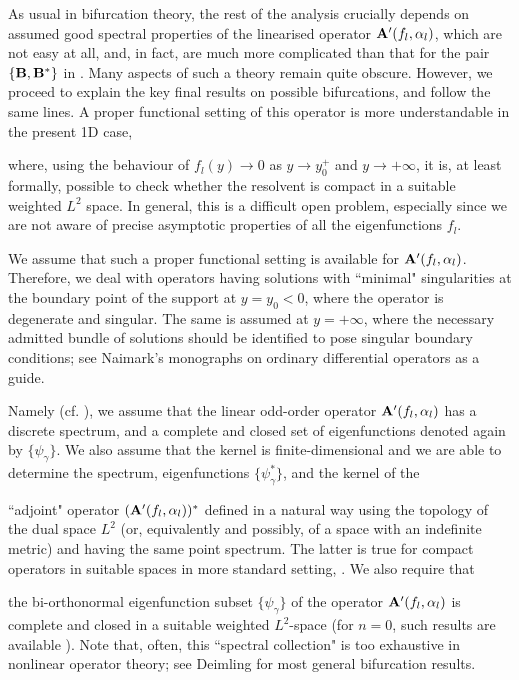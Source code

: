 \documentclass[12pt]{amsart}
\begin{document}
   As usual in bifurcation theory,
 the rest of the analysis crucially  depends on assumed good  spectral properties of
 the linearised operator ${\bf A}'(f_l,{\alpha}_l)$, which are not easy at all, and,
 in fact, are much more
 complicated than that for the pair $\{{{\bf B}},{{\bf B}}^*\}$ in \cite{RayGI}.
 Many aspects of such a theory remain quite obscure. However, we
 proceed to explain the key final results on possible bifurcations,
  and follow the same lines.
  A proper functional setting of this
 operator is more understandable in the present 1D case,
 
 
 
  where, using the behaviour of
 $f_l(y) \to 0$ as $ y \to y_0^+$ and $y \to +{\infty}$, it is, at least formally,
  possible to check whether the
 resolvent is compact in a suitable weighted $L^2$ space. In
 general, this is a difficult open problem, especially since we are not aware of precise asymptotic properties of all the
 eigenfunctions $f_l$.

We assume that such a proper functional setting is available
 for ${\bf A}'(f_l,{\alpha}_l)$. Therefore,
we deal with operators having solutions with ``minimal"
singularities at the boundary point of the support at $y=y_0<0$,
where the operator is degenerate and singular. The same is assumed
 at $y=+{\infty}$, where the necessary admitted bundle of solutions
should be identified to pose singular boundary conditions; see
Naimark's monographs on ordinary differential operators
\cite{NaimarkI, NaimarkII} as a guide.

  Namely (cf. \cite[\S~4]{RayGI}), we assume that the linear odd-order operator
   ${\bf A}'(f_l,{\alpha}_l)$ has a discrete spectrum, and a complete and closed set of
eigenfunctions
   denoted again by $\{\psi_{\gamma}\}$. We also assume that the kernel is finite-dimensional
   and we are able to
  determine the spectrum, eigenfunctions $\{\psi_{\gamma}^*\}$, and  the kernel of the
  
 ``adjoint" operator $({\bf A}'(f_l,{\alpha}_l))^*$ defined in  a natural
  way using the topology of the dual space $L^2$ (or, equivalently and possibly, of a space
   with an indefinite metric)
     and having
  the same point spectrum.
    The latter  is true for compact operators in
 suitable spaces in more standard setting,
  \cite[Ch.~4]{FuncAnaly}.
  We also require that
 
 
 the bi-orthonormal eigenfunction
  subset $\{\psi_{\gamma}\}$ of the operator ${\bf A}'(f_l,{\alpha}_l)$
  is complete and  closed in a suitable weighted $L^2$-space (for $n=0$,
   such results are available \cite{RayGI}). Note that, often,  this ``spectral collection" is
   too exhaustive in nonlinear operator theory; see Deimling
   \cite[p.~412]{NonFuncAnaly} for most general bifurcation results.
\end{document}
